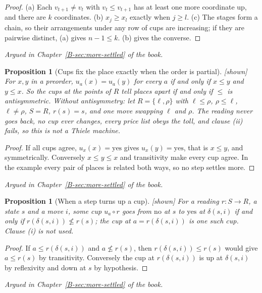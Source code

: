\documentclass[11pt, a4paper]{article}
\theoremstyle{plain}
\newtheorem{proposition}[theorem]{Proposition}
\theoremstyle{definition}
\theoremstyle{remark}
\newcommand{\step}{\delta}
\newcommand{\rd}{r}
\newcommand{\argued}[1]{\par\noindent\textit{Argued in Chapter~\ref{B-#1} of the book.}\par}
\newcommand{\kind}[1]{\textup{[#1]}}
\begin{document}
\begin{proof}
(a) Each $v_{t+1}\ne v_t$ with $v_t\le v_{t+1}$ has at least one more coordinate up, and there are
$k$ coordinates. (b) $x_j\ge x_l$ exactly when $j\ge l$. (c) The stages form a chain, so their
arrangements under any row of cups are increasing; if they are pairwise distinct, (a) gives
$n-1\le k$. (b) gives the converse.
\end{proof}

\argued{sec:more-settled}

\begin{proposition}[Cups fix the place exactly when the order is partial]\label{spec:antisym}
\kind{shown}
For $x,y$ in a preorder, $u_a(x)=u_a(y)$ for every $a$ if and only if $x\le y$ and $y\le x$. So the cups
at the points of $R$ tell places apart if and only if $\le$ is antisymmetric. Without antisymmetry: let
$R=\{\ell,\rho\}$ with $\ell\le\rho$, $\rho\le\ell$, $\ell\ne\rho$, $S=R$, $\rd(s)=s$, and one move
swapping $\ell$ and $\rho$. The reading never goes back, no cup ever changes, every price list obeys
the toll, and clause (ii) fails, so this is not a Thiele machine.
\end{proposition}

\begin{proof}
If all cups agree, $u_x(x)=\mathrm{yes}$ gives $u_x(y)=\mathrm{yes}$, that is $x\le y$, and symmetrically.
Conversely $x\le y\le x$ and transitivity make every cup agree. In the example every pair of places is
related both ways, so no step settles more.
\end{proof}

\argued{sec:more-settled}

\begin{proposition}[When a step turns up a cup]\label{spec:turns-up} \kind{shown}
For a reading $\rd:S\to R$, a state $s$ and a move $i$, some cup $u_a\circ\rd$ goes from $\mathrm{no}$
at $s$ to $\mathrm{yes}$ at $\step(s,i)$ if and only if $\rd(\step(s,i))\not\le\rd(s)$; the cup at
$a=\rd(\step(s,i))$ is one such cup. Clause (i) is not used.
\end{proposition}

\begin{proof}
If $a\le\rd(\step(s,i))$ and $a\not\le\rd(s)$, then $\rd(\step(s,i))\le\rd(s)$ would give $a\le\rd(s)$ by
transitivity. Conversely the cup at $\rd(\step(s,i))$ is up at $\step(s,i)$ by reflexivity and down at $s$
by hypothesis.
\end{proof}

\argued{sec:more-settled}
\end{document}
